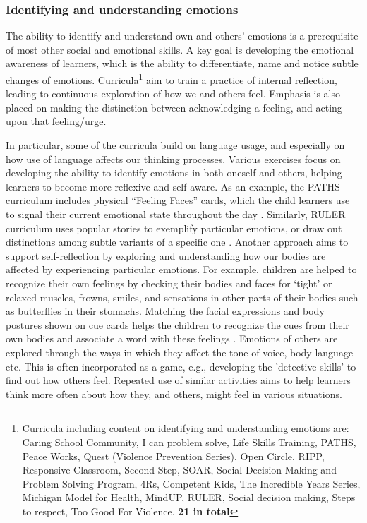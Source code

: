 \documentclass[prodmode,acmtochi]{acmsmall}
\newcommand{\GeraldineFIX}[1]{}
\begin{document}
\subsubsection{Identifying and understanding emotions} 

The ability to identify and understand own and others' emotions is a prerequisite of most other social and emotional skills. A key goal is developing the emotional awareness of learners, which is the ability to differentiate, name and notice subtle changes of emotions. Curricula\footnote{Curricula including content on identifying and understanding emotions are: Caring School Community, I can problem solve, Life Skills Training, PATHS, Peace Works, Quest (Violence Prevention Series), Open Circle, RIPP, Responsive Classroom, Second Step, SOAR, Social Decision Making and Problem Solving Program, 4Rs, Competent Kids, The Incredible Years Series, Michigan Model for Health, MindUP, RULER, Social decision making, Steps to respect, Too Good For Violence. {\bf 21 in total}} aim to train a practice of internal reflection, leading to continuous exploration of how we and others feel. Emphasis is also placed on making the distinction between acknowledging a feeling, and acting upon that feeling/urge. 
\GeraldineFIX{G: all the other subsections list the relevant curricula at the beginning of the section so maybe move the footnote with the list from end of section to here}

In particular, some of the curricula build on language usage, and especially on how use of language affects our thinking processes. Various exercises focus on developing the ability to identify emotions in both oneself and others, helping learners to become more reflexive and self-aware. As an example, the PATHS curriculum  includes physical ``Feeling Faces'' cards, which the child learners use to signal their current emotional state throughout the day \cite{Kam2004,Domitrovich2007}. Similarly,  RULER curriculum uses popular stories to exemplify particular emotions, or draw out distinctions among subtle variants of a specific one \cite{Reyes2012}. 
%
Another approach aims to support self-reflection by exploring and understanding how our bodies are affected by experiencing particular emotions. For example, children are helped to recognize their own feelings by checking their bodies and faces for `tight' or relaxed muscles, frowns, smiles, and sensations in other parts of their bodies such as butterflies in their stomachs. Matching the facial expressions and body postures shown on cue cards helps the children to recognize the cues from their own bodies and associate a word with these feelings \cite{Webster-Stratton2004}. 
%               
Emotions of others are explored through the ways in which they affect the tone of voice, body language etc. This is often incorporated as a game, e.g., developing the 'detective skills' to find out how others feel. Repeated   use of similar activities aims to help learners think more often about how they, and others, might feel in various situations. 
\GeraldineFIX{G: do you really mean constant ie no break???}
\end{document}
